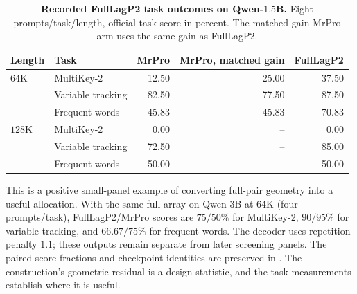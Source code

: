 \begin{table}[ht]
\centering\small
\caption{\textbf{Recorded FullLagP2 task outcomes on Qwen-$1.5$B.} Eight prompts/task/length, official task score in percent. The matched-gain MrPro arm uses the same gain as FullLagP2.}
\label{tab:full-lag-profile}
\begin{tabular}{@{}llrrr@{}}
\toprule
Length & Task & MrPro & MrPro, matched gain & FullLagP2 \\
\midrule
$64$K & MultiKey-2 & 12.50 & 25.00 & 37.50 \\
 & Variable tracking & 82.50 & 77.50 & 87.50 \\
 & Frequent words & 45.83 & 45.83 & 70.83 \\
$128$K & MultiKey-2 & 0.00 & -- & 0.00 \\
 & Variable tracking & 72.50 & -- & 85.00 \\
 & Frequent words & 50.00 & -- & 50.00 \\
\bottomrule
\end{tabular}
\end{table}

This is a positive small-panel example of converting full-pair geometry into a useful allocation. With the same full array on Qwen-$3$B at $64$K (four prompts/task), FullLagP2/MrPro scores are $75/50\%$ for MultiKey-2, $90/95\%$ for variable tracking, and $66.67/75\%$ for frequent words. The decoder uses repetition penalty $1.1$; these outputs remain separate from later screening panels. The paired score fractions and checkpoint identities are preserved in . The construction's geometric residual is a design statistic, and the task measurements establish where it is useful.
\FloatBarrier
